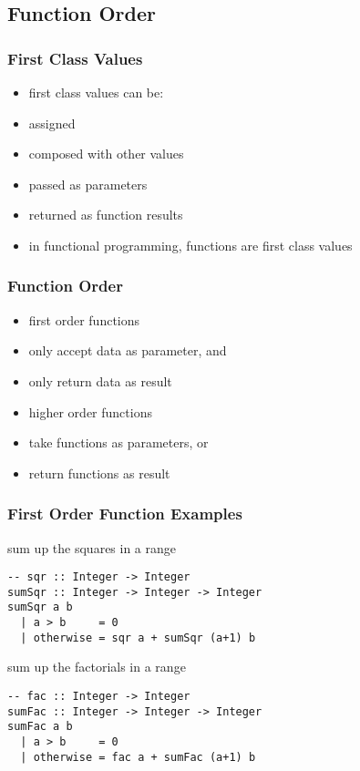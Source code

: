 \documentclass[dvipsnames]{beamer}
\theoremstyle{plain}
\begin{document}
\subsection{Function Order}

\begin{frame}
  \frametitle{First Class Values}

  \begin{itemize}
    \item \alert{first class values} can be:

    \smallskip
    \item assigned
    \item composed with other values
    \item passed as parameters
    \item returned as function results

    \pause
    \bigskip
    \item in functional programming, functions are first class values
  \end{itemize}
\end{frame}

\begin{frame}[fragile]
  \frametitle{Function Order}

  \begin{itemize}
    \item \alert{first order functions}
    \smallskip
    \item only accept data as parameter, and
    \item only return data as result

    \pause
    \bigskip
    \item \alert{higher order functions}
    \smallskip
    \item take functions as parameters, or
    \item return functions as result
  \end{itemize}
\end{frame}

\begin{frame}[fragile]
  \frametitle{First Order Function Examples}

  \begin{exampleblock}{sum up the squares in a range}
    \begin{lstlisting}
-- sqr :: Integer -> Integer
sumSqr :: Integer -> Integer -> Integer
sumSqr a b
  | a > b     = 0
  | otherwise = sqr a + sumSqr (a+1) b
    \end{lstlisting}
  \end{exampleblock}

  \pause
  \begin{exampleblock}{sum up the factorials in a range}
    \begin{lstlisting}
-- fac :: Integer -> Integer
sumFac :: Integer -> Integer -> Integer
sumFac a b
  | a > b     = 0
  | otherwise = fac a + sumFac (a+1) b
    \end{lstlisting}
  \end{exampleblock}
\end{frame}
\end{document}
